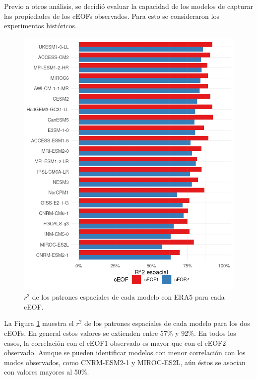 \documentclass[12pt,oneside,a4paper]{reedthesis}
\begin{document}
Previo a otros análisis, se decidió evaluar la capacidad de los modelos de capturar las propiedades de los cEOFs observados.
Para esto se consideraron los experimentos históricos.



\begin{figure}

{\centering \includegraphics{figures/50-cmip6/comparacion-r2-1} 

}

\caption{\(r^2\) de los patrones espaciales de cada modelo con ERA5 para cada cEOF.}\label{fig:comparacion-r2}
\end{figure}

La Figura \ref{fig:comparacion-r2} muestra el \(r^2\) de los patrones espaciales de cada modelo para los dos cEOFs.
En general estos valores se extienden entre 57\% y 92\%.
En todos los casos, la correlación con el cEOF1 observado es mayor que con el cEOF2 observado.
Aunque se pueden identificar modelos con menor correlación con los modos observados, como CNRM-ESM2-1 y MIROC-ES2L, aún éstos se asocian con valores mayores al 50\%.
\end{document}
